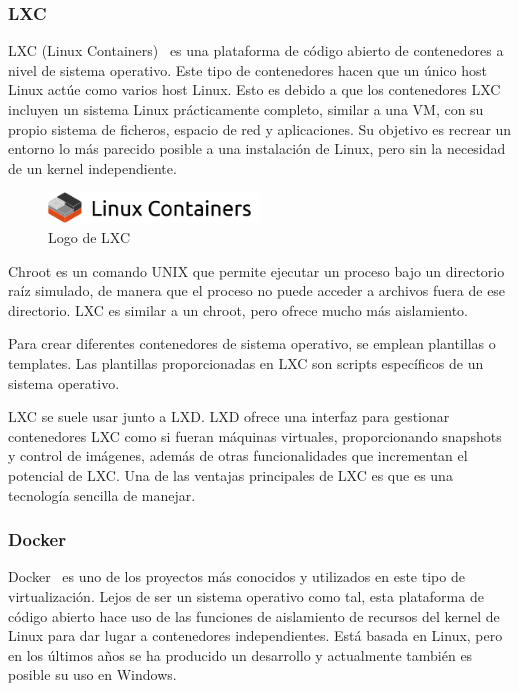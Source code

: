 \subsubsection{LXC}
	LXC (Linux Containers)~\cite{lxc} es una plataforma de código abierto de contenedores a nivel de sistema operativo. Este tipo de contenedores hacen que un único host Linux actúe como varios host Linux. Esto es debido a que los contenedores LXC incluyen un sistema Linux prácticamente completo, similar a una VM, con su propio sistema de ficheros, espacio de red y aplicaciones. Su objetivo es recrear un entorno lo más parecido posible a una instalación de Linux, pero sin la necesidad de un kernel independiente. 

	\begin{figure}[h]
	\centering
	\includegraphics[width=0.5\textwidth]{../imgs/EdA/lxc.png}
	\caption{Logo de LXC}
	\label{fig:lxc}
	\end{figure}

	Chroot es un comando UNIX que permite ejecutar un proceso bajo un directorio raíz simulado, de manera que el proceso no puede acceder a archivos fuera de ese directorio. LXC es similar a un chroot, pero ofrece mucho más aislamiento. 

	Para crear diferentes contenedores de sistema operativo, se emplean plantillas o templates. Las plantillas proporcionadas en LXC son scripts específicos de un sistema operativo.

	LXC se suele usar junto a LXD. LXD ofrece una interfaz para gestionar contenedores LXC como si fueran máquinas virtuales, proporcionando snapshots y control de imágenes, además de otras funcionalidades que incrementan el potencial de LXC. Una de las ventajas principales de LXC es que es una tecnología sencilla de manejar.
\clearpage

\subsubsection{Docker}
	Docker~\cite{docker1} es uno de los proyectos más conocidos y utilizados en este tipo de virtualización. Lejos de ser un sistema operativo como tal, esta plataforma de código abierto hace uso de las funciones de aislamiento de recursos del kernel de Linux para dar lugar a contenedores independientes. Está basada en Linux, pero en los últimos años se ha producido un desarrollo y actualmente también es posible su uso en Windows.

